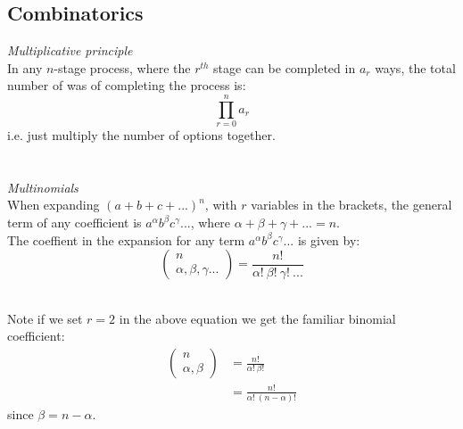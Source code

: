 \documentclass{scrartcl}
\begin{document}
\subsection{Combinatorics}
\textit{Multiplicative principle}
\\
In any $ n $-stage process, where the $ r^{th} $ stage can be completed in $ a_{r} $ ways, the total number of was of completing the process is:
\begin{equation}
\prod_{r = 0}^{n} a_{r}
\end{equation}
i.e. just multiply the number of options together.
\\\\
\\
\textit{Multinomials}
\\
When expanding $ (a + b + c + ...)^{n} $, with $ r $ variables in the brackets, the general term of any coefficient is $ a^{\alpha} b^{\beta} c^{\gamma}... $, where $ \alpha + \beta + \gamma + ... = n $.
\\
The coeffient in the expansion for any term $ a^{\alpha} b^{\beta} c^{\gamma}... $ is given by:
\begin{equation}
\begin{pmatrix}
n \\ \alpha,  \beta,  \gamma ...
\end{pmatrix}
=
\frac{n!}{\alpha! \ \beta! \ \gamma! \ ... }
\end{equation}
\\
\begin{tcolorbox}[breakable]
Note if we set $ r = 2 $ in the above equation we get the familiar binomial coefficient:
\begin{align}
\begin{pmatrix}
n \\ \alpha,  \beta
\end{pmatrix}
& =
\frac{n!}{\alpha! \ \beta!} \\
& = \frac{n!}{\alpha! \ (n - \alpha)!}
\end{align}
since $ \beta = n - \alpha $.
\end{tcolorbox}
\end{document}
